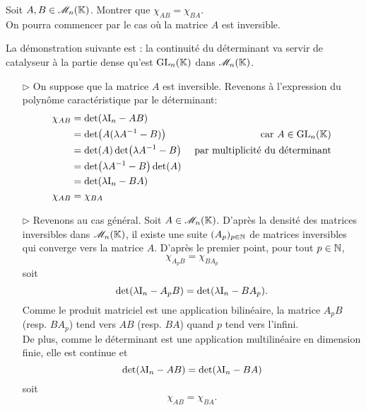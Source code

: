\begin{exercice}
    Soit $A, B \in \mathscr{M}_n(\mathbb{K})$. Montrer que $\chi_{AB}=\chi_{BA}$. \\
    On pourra commencer par le cas où la matrice $A$ est inversible.
\end{exercice}

La démonstration suivante est : la continuité du déterminant va servir de catalyseur à la partie dense qu'est $\mathrm{GL}_n(\mathbb{K})$ dans $\mathscr{M}_n(\mathbb{K})$.

\begin{solution}
    \begin{itemize}
    \item[$\rhd$] On suppose que la matrice $A$ est inversible. Revenons à l'expression du polynôme caractéristique par le déterminant:
        \begin{align*}
        \chi_{AB} &= \det(\lambda \mathrm{I}_n - AB) \\
        &= \det(A(\lambda A^{-1} - B)) &\text{car } A \in \mathrm{GL}_n(\mathbb{K}) \\
        &= \det(A) \det(\lambda A^{-1} - B) &\text{ par multiplicité du déterminant} \\
        &= \det(\lambda A^{-1} - B) \det(A) \\
        &= \det(\lambda \mathrm{I}_n - BA) \\
        \chi_{AB} &= \chi_{BA}
    \end{align*}
    \item[$\rhd$] Revenons au cas général. Soit $A \in \mathscr{M}_n(\mathbb{K})$. D'après la densité des matrices inversibles dans $\mathscr{M}_n(\mathbb{K})$, il existe une suite $(A_p)_{p \in \mathbb{N}}$ de matrices inversibles qui converge vers la matrice $A$. D'après le premier point, pour tout $p \in \mathbb{N}$,
    $$\chi_{A_p B} = \chi_{B A_p}$$
    soit 
    $$\det(\lambda \mathrm{I}_n - A_p B) = \det(\lambda \mathrm{I}_n - B A_p).$$
    Comme le produit matriciel est une application bilinéaire, la matrice $A_p B$ (resp. $B A_p$) tend vers $AB$ (resp. $BA$) quand $p$ tend vers l'infini. \\ De plus, comme le déterminant est une application multilinéaire en dimension finie, elle est continue et 
    $$\det(\lambda \mathrm{I}_n - A B) = \det(\lambda \mathrm{I}_n - B A)$$
    soit 
    $$\chi_{A B} = \chi_{B A}.$$
    \end{itemize}
\end{solution}

